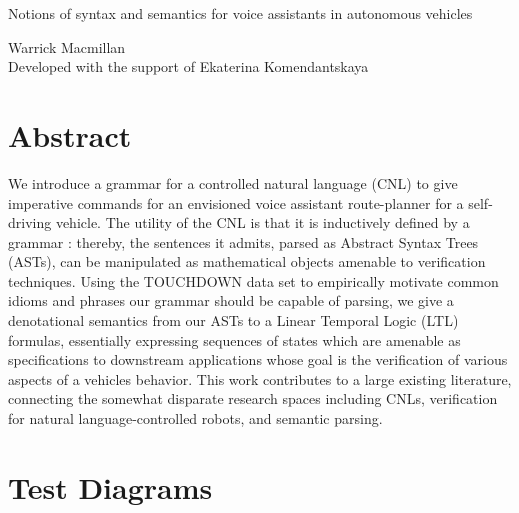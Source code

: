 \documentclass[a4paper, 11pt]{article}
\begin{document}

\begin{titlepage}

\vspace*{1cm}

\begin{center} \Large Notions of syntax and semantics
  for voice assistants in autonomous vehicles  \\ 


\vspace{1.5cm}

\large Warrick Macmillan  \\
\large Developed with the support of Ekaterina Komendantskaya
\end{center}


\end{titlepage}

\section{Abstract} 

We introduce a grammar for a controlled natural language (CNL) to give
imperative commands for an envisioned voice assistant route-planner for a
self-driving vehicle. The utility of the CNL is that it is inductively defined
by a grammar : thereby, the sentences it admits, parsed as Abstract Syntax Trees
(ASTs), can be manipulated as mathematical objects amenable to verification
techniques. Using the TOUCHDOWN data set to empirically motivate common idioms
and phrases our grammar should be capable of parsing, we give a denotational
semantics from our ASTs to a Linear Temporal Logic (LTL) formulas, essentially
expressing sequences of states which are amenable as specifications to
downstream applications whose goal is the verification of various aspects of a
vehicles behavior. This work contributes to a large existing literature,
connecting the somewhat disparate research spaces including CNLs, verification
for natural language-controlled robots, and semantic parsing.

\section{Test Diagrams}
\end{document}
